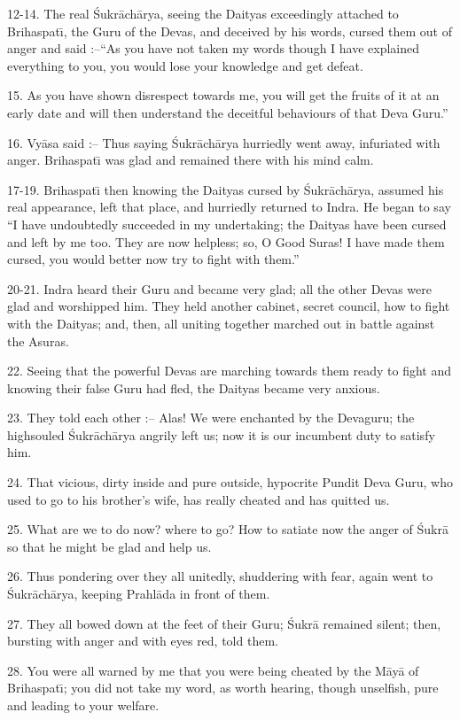 12-14. The real \'Sukr\=ach\=arya, seeing the Daityas exceedingly attached to Brihaspat\={\i}, the Guru of the Devas, and deceived by his words, cursed them out of anger and said :--``As you have not taken my words though I have explained everything to you, you would lose your knowledge and get defeat.

15. As you have shown disrespect towards me, you will get the fruits of it at an early date and will then understand the deceitful behaviours of that Deva Guru.''

16. Vy\=asa said :-- Thus saying \'Sukr\=ach\=arya hurriedly went away, infuriated with anger. Brihaspat\={\i} was glad and remained there with his mind calm.

17-19. Brihaspat\={\i} then knowing the Daityas cursed by \'Sukr\=ach\=arya, assumed his real appearance, left that place, and hurriedly returned to Indra. He began to say ``I have undoubtedly succeeded in my undertaking; the Daityas have been cursed and left by me too. They are now helpless; so, O Good Suras! I have made them cursed, you would better now try to fight with them.''

20-21. Indra heard their Guru and became very glad; all the other Devas were glad and worshipped him. They held another cabinet, secret council, how to fight with the Daityas; and, then, all uniting together marched out in battle against the Asuras.

22. Seeing that the powerful Devas are marching towards them ready to fight and knowing their false Guru had fled, the Daityas became very anxious.

23. They told each other :-- Alas! We were enchanted by the Devaguru; the highsouled \'Sukr\=ach\=arya angrily left us; now it is our incumbent duty to satisfy him.

24. That vicious, dirty inside and pure outside, hypocrite Pundit Deva Guru, who used to go to his brother's wife, has really cheated and has quitted us.

25. What are we to do now? where to go? How to satiate now the anger of \'Sukr\=a so that he might be glad and help us.

26. Thus pondering over they all unitedly, shuddering with fear, again went to \'Sukr\=ach\=arya, keeping Prahl\=ada in front of them.

27. They all bowed down at the feet of their Guru; \'Sukr\=a remained silent; then, bursting with anger and with eyes red, told them.

28. You were all warned by me that you were being cheated by the M\=ay\=a of Brihaspat\={\i}; you did not take my word, as worth hearing, though unselfish, pure and leading to your welfare.

